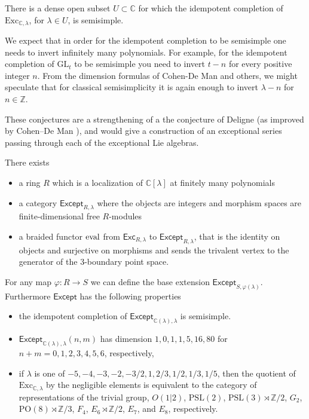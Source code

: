 \documentclass[12pt]{amsart}
\begin{document}
\begin{conjecture}
There is a dense open subset $U \subset \mathbb{C}$ for which the idempotent completion of $\mathrm{Exc}_{\mathbb{C},\lambda}$, for $\lambda \in U$, is semisimple.
\end{conjecture}

We expect that in order for the idempotent completion to be semisimple one needs to invert infinitely many polynomials.  For example, for the idempotent completion of $\mathrm{GL}_t$ to be semisimple you need to invert $t-n$ for every positive integer $n$.  From the dimension formulas of Cohen-De Man and others, we might speculate that for classical semisimplicity it is again enough to invert $\lambda-n$ for $n \in \mathbb{Z}$.

These conjectures are a strengthening of a the conjecture of Deligne (as improved by Cohen--De Man ), and would give a construction of an exceptional series passing through each of the exceptional Lie algebras.

\begin{conjecture}
There exists
  \begin{itemize}
  \item a ring $R$ which is a localization of $\mathbb{C}[\lambda]$ at finitely many polynomials
  \item a category $\mathsf{Except}_{R,\lambda}$ where the objects are integers and morphism spaces are finite-dimensional free $R$-modules 
  \item a braided functor $\operatorname{eval}$ from $\mathsf{Exc}_{R,\lambda}$ to $\mathsf{Except}_{R,\lambda}$, that is the identity on objects and surjective on morphisms and sends the trivalent vertex to the generator of the $3$-boundary point space. 
  \end{itemize}
For any map $\varphi: R \rightarrow S$ we can define the base extension $\mathsf{Except}_{S,\varphi(\lambda)}$.  Furthermore $\mathsf{Except}$ has the following properties
\begin{itemize}
\item the idempotent completion of $\mathsf{Except}_{\mathbb{C}(\lambda),\lambda}$ is semisimple.
\item $\mathsf{Except}_{\mathbb{C}(\lambda),\lambda}(n,m)$ has dimension $1,\allowbreak0,\allowbreak1,\allowbreak1,\allowbreak5,\allowbreak16,\allowbreak80$
for $n+m=0,1,2,3,4,5,6$, respectively, 
\item if $\lambda$ is one of $-5, -4, -3, -2, -3/2,1,2/3,1/2, 1/3, 1/5$, then the quotient of $\mathrm{Exc}_{\mathbb{C},\lambda}$ by the negligible elements is equivalent to the category of representations of the trivial group, $O(1 | 2)$, $\mathrm{PSL}(2)$, $\mathrm{PSL}(3) \rtimes \mathbb{Z}/2$, $G_2$, $\mathrm{PO}(8) \rtimes \mathbb{Z}/3$, $F_4$, $E_6 \rtimes \mathbb{Z}/2$, $E_7$, and $E_8$, respectively.
\end{itemize}
\end{conjecture}
\end{document}
